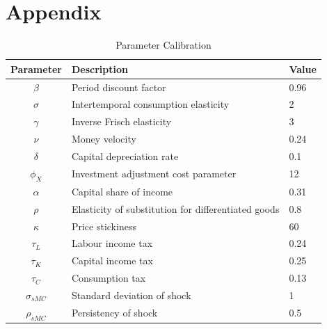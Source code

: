 \documentclass[12pt]{article}
\begin{document}
\section{Appendix}
\begin{table}[ht]
    \centering
    \caption{Parameter Calibration}\label{tab:parameters}
    \begin{tabular}{cll}
        \toprule
        Parameter & Description & Value  \\ \midrule
        $\beta$ & Period discount factor  & 0.96  \\
        $\sigma$ & Intertemporal consumption elasticity  & 2  \\
        $\gamma$ & Inverse Frisch elasticity  & 3  \\
        $\nu$ & Money velocity  & 0.24  \\
        $\delta$ & Capital depreciation rate  & 0.1  \\
        $\phi_X$ & Investment adjustment cost parameter & 12  \\
        $\alpha$ & Capital share of income & 0.31  \\
        $\rho$ & Elasticity of substitution for differentiated goods &  0.8  \\
        $\kappa$ & Price stickiness & 60 \\
        ${\tau_L}$ & Labour income tax & 0.24 \\
        ${\tau_K}$ & Capital income tax & 0.25 \\
        ${\tau_C}$ & Consumption tax & 0.13 \\
        $\sigma_{sMC}$ & Standard deviation of shock & 1 \\
        $\rho_{sMC}$ & Persistency of shock & 0.5 \\
    \bottomrule
    \end{tabular}
\end{table}
\end{document}
